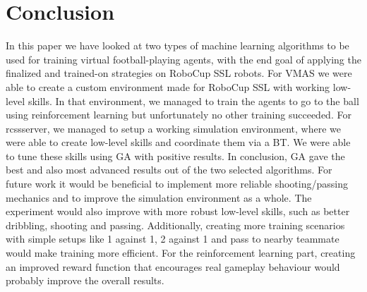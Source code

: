 \section{Conclusion}

In this paper we have looked at two types of machine learning algorithms to be used for training virtual football-playing agents, with the end goal of applying the finalized and trained-on strategies on RoboCup SSL robots. For VMAS we were able to create a custom environment made for
RoboCup SSL with working low-level skills. In that environment, we managed to train the agents to go to the
ball using reinforcement learning but unfortunately no
other training succeeded. For rcssserver, we managed to setup a working simulation environment, where we were able to create low-level skills and
coordinate them via a BT. We were able to tune these skills using
GA with positive results.
In conclusion, GA gave the best and also most advanced results out of the two selected algorithms.
For future work it would be beneficial to implement more reliable shooting/passing mechanics and to improve the 
simulation environment as a whole. The experiment would also improve with more robust low-level skills, such as
better dribbling, shooting and passing. Additionally, creating more training scenarios with simple setups like 1 against 1,
2 against 1 and pass to nearby teammate would make training more efficient. For the reinforcement learning part, creating
an improved reward function that encourages real gameplay behaviour would probably improve the overall results.
